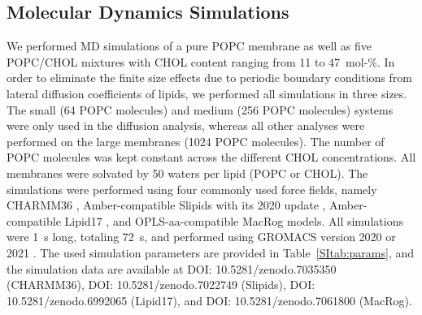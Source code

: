 \documentclass[aps,prl,superscriptaddress]{revtex4-2}
\begin{document}
\subsection{Molecular Dynamics Simulations}

We performed MD simulations of a pure POPC membrane as well as five POPC/CHOL mixtures with CHOL content ranging from 11 to 47~mol-\%. In order to eliminate the finite size effects due to periodic boundary conditions from lateral diffusion coefficients of lipids, we performed all simulations in three sizes. The small (64 POPC molecules) and medium (256 POPC molecules) systems were only used in the diffusion analysis, whereas all other analyses were performed on the large membranes (1024 POPC molecules). The number of POPC molecules was kept constant across the different CHOL concentrations. All membranes were solvated by 50 waters per lipid (POPC or CHOL). The simulations were performed using four commonly used force fields, namely CHARMM36 \cite{Klauda06,lim12}, Amber-compatible Slipids \cite{jambeck12,jambeck12b,jambeck13b} with its 2020 update \cite{grote2020optimization}, Amber-compatible Lipid17 \cite{dickson14,madej15}, and OPLS-aa-compatible MacRog \cite{kulig14,kulig15,Kulig15b} models. All simulations were 1~\textmu{}s long, totaling 72~\textmu{}s, and performed using GROMACS version 2020 or 2021 \cite{pall2020heterogeneous}. The used simulation parameters are provided in Table~\ref{SItab:params}, and the simulation data are available at DOI: 10.5281/zenodo.7035350 (CHARMM36), DOI: 10.5281/zenodo.7022749 (Slipids), DOI: 10.5281/zenodo.6992065 (Lipid17), and DOI: 10.5281/zenodo.7061800 (MacRog).

\end{document}
